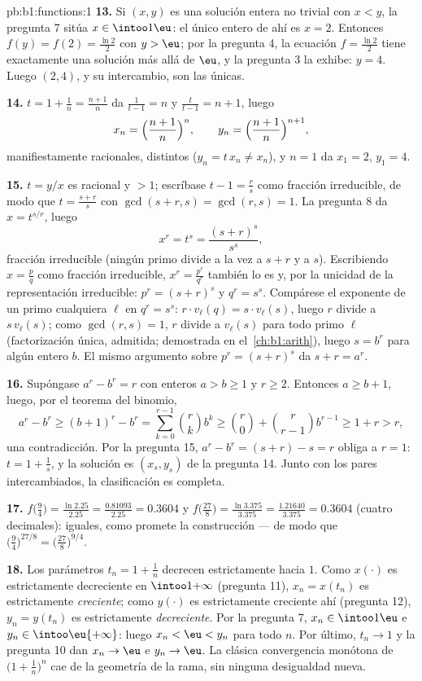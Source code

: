 \begin{solution}{pb:b1:functions:1}
\textbf{13.} Si $(x, y)$ es una solución entera no trivial con $x < y$,
la pregunta 7 sitúa $x \in \intoo1\eu$: el único entero de ahí es
$x = 2$. Entonces $f(y) = f(2) = \frac{\ln2}2$ con $y > \eu$; por la
pregunta 4, la ecuación $f = \frac{\ln2}2$ tiene exactamente una
solución más allá de $\eu$, y la pregunta 3 la exhibe: $y = 4$. Luego
$(2, 4)$, y su intercambio, son las únicas.

\textbf{14.} $t = 1 + \frac1n = \frac{n+1}n$ da $\frac1{t - 1} = n$ y
$\frac t{t-1} = n + 1$, luego
\[
x_n = \Bigl(\frac{n+1}n\Bigr)^{n},
\qquad
y_n = \Bigl(\frac{n+1}n\Bigr)^{n+1},
\]
manifiestamente racionales, distintos ($y_n = t\,x_n \neq x_n$), y
$n = 1$ da $x_1 = 2$, $y_1 = 4$.

\textbf{15.} $t = y/x$ es racional y $> 1$; escríbase
$t - 1 = \frac rs$ como fracción irreducible, de modo que
$t = \frac{s + r}s$ con $\gcd(s + r, s) = \gcd(r, s) = 1$. La
pregunta 8 da $x = t^{s/r}$, luego
\[
x^r = t^s = \frac{(s+r)^s}{s^s} ,
\]
fracción irreducible (ningún primo divide a la vez a $s + r$ y a $s$).
Escribiendo $x = \frac pq$ como fracción irreducible,
$x^r = \frac{p^r}{q^r}$ también lo es y, por la unicidad de la
representación irreducible: $p^r = (s+r)^s$ y $q^r = s^s$. Compárese el
exponente de un primo cualquiera $\ell$ en $q^r = s^s$:
$r \cdot v_\ell(q) = s \cdot v_\ell(s)$, luego $r$ divide a
$s\,v_\ell(s)$; como $\gcd(r, s) = 1$, $r$ divide a $v_\ell(s)$ para
todo primo $\ell$ (factorización única, admitida; demostrada en
el~\cref{ch:b1:arith}), luego $s = b^r$ para algún entero $b$. El mismo
argumento sobre $p^r = (s+r)^s$ da $s + r = a^r$.

\textbf{16.} Supóngase $a^r - b^r = r$ con enteros $a > b \geq 1$ y
$r \geq 2$. Entonces $a \geq b + 1$, luego, por el teorema del binomio,
\[
a^r - b^r \geq (b+1)^r - b^r
= \sum_{k=0}^{r-1}\binom rk b^k
\geq \binom r0 + \binom r{r-1} b^{r-1}
\geq 1 + r > r ,
\]
una contradicción. Por la pregunta 15,
$a^r - b^r = (s + r) - s = r$ obliga a $r = 1$: $t = 1 + \frac1s$, y la
solución es $(x_s, y_s)$ de la pregunta 14. Junto con los pares
intercambiados, la clasificación es completa.

\textbf{17.} $f\bigl(\tfrac94\bigr) = \frac{\ln 2.25}{2.25} =
\frac{0.81093}{2.25} = 0.3604$ y $f\bigl(\tfrac{27}8\bigr) =
\frac{\ln 3.375}{3.375} = \frac{1.21640}{3.375} = 0.3604$ (cuatro
decimales): iguales, como promete la construcción --- de modo que
$\bigl(\tfrac94\bigr)^{27/8} = \bigl(\tfrac{27}8\bigr)^{9/4}$.

\textbf{18.} Los parámetros $t_n = 1 + \frac1n$ decrecen estrictamente
hacia $1$. Como $x(\cdot)$ es estrictamente decreciente en
$\intoo1{+\infty}$ (pregunta 11), $x_n = x(t_n)$ es estrictamente
\emph{creciente}; como $y(\cdot)$ es estrictamente creciente ahí
(pregunta 12), $y_n = y(t_n)$ es estrictamente \emph{decreciente}. Por
la pregunta 7, $x_n \in \intoo1\eu$ e $y_n \in \intoo\eu{+\infty}$:
luego $x_n < \eu < y_n$ para todo $n$. Por último, $t_n \to 1$ y la
pregunta 10 dan $x_n \to \eu$ e $y_n \to \eu$. La clásica convergencia
monótona de $\bigl(1 + \frac1n\bigr)^n$ cae de la geometría de la rama,
sin ninguna desigualdad nueva.


\end{solution}
